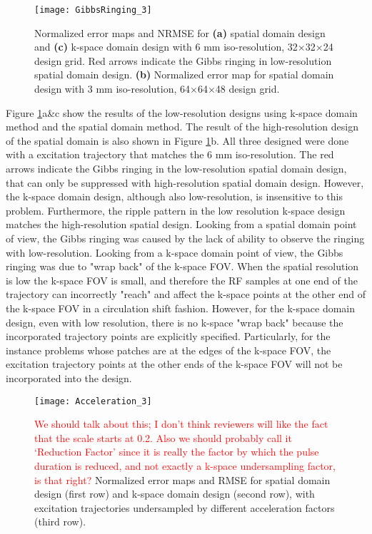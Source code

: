 \begin{figure}
	\centering
	\texttt{[image: GibbsRinging\_3]}
	\caption{Normalized error maps and NRMSE for \textbf{(a)} spatial domain design and \textbf{(c)} k-space domain design with 6 mm iso-resolution, 32$\times$32$\times$24 design grid. Red arrows indicate the Gibbs ringing in low-resolution spatial domain design. \textbf{(b)} Normalized error map for spatial domain design with 3 mm iso-resolution, 64$\times$64$\times$48 design grid.}
	\label{fig:GibbsRing}
\end{figure}

Figure \ref{fig:GibbsRing}a\&c show the results of the  low-resolution designs using k-space domain method and the spatial domain method. The result of the high-resolution design of the spatial domain is also shown in Figure \ref{fig:GibbsRing}b. All three designed were done with a excitation trajectory that matches the 6 mm iso-resolution. The red arrows indicate the Gibbs ringing in the low-resolution spatial domain design, that can only be suppressed with high-resolution spatial domain design. However, the k-space domain design, although also low-resolution, is insensitive to this problem. Furthermore, the ripple pattern in the low resolution k-space design matches the high-resolution spatial design. Looking from a spatial domain point of view, the Gibbs ringing was caused by the lack of ability to observe the ringing with low-resolution. Looking from a k-space domain point of view, the Gibbs ringing was due to "wrap back" of the k-space FOV. When the spatial resolution is low the k-space FOV is small, and therefore the RF samples at one end of the trajectory can incorrectly "reach" and affect the k-space points at the other end of the k-space FOV in a circulation shift fashion. However, for the k-space domain design, even with low resolution, there is no k-space "wrap back" because the incorporated trajectory points are explicitly specified. Particularly, for the instance problems whose patches are at the edges of the k-space FOV, the excitation trajectory points at the other ends of the k-space FOV will not be incorporated into the design.    


\begin{figure}
	\centering
	\texttt{[image: Acceleration\_3]}
	\caption{ \textcolor{red}{We should talk about this; I don't think reviewers will like the fact that the scale starts at 0.2. Also we should probably call it `Reduction Factor' since it is 
	really the factor by which the pulse duration is reduced, and not exactly a k-space undersampling factor, is that right?}
	Normalized error maps and RMSE for spatial domain design (first row) and k-space domain design (second row), with excitation trajectories undersampled by different acceleration factors (third row).}
	\label{fig:kspace_PTX_Acceleration}
\end{figure}

